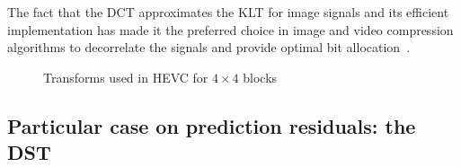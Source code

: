 \documentclass[11pt,a4paper,openright,twoside]{book}
\numberwithin{equation}{section} %
\numberwithin{figure}{section} %
\numberwithin{table}{section} %
\begin{document}
The fact that the \ac{DCT} approximates the \ac{KLT} for image signals and its
efficient implementation has made it the preferred choice in image and video
compression algorithms to decorrelate the signals and provide optimal bit
allocation~\cite{sole-12-transform-coefficient-coding}.

\begin{figure}[tb]
	\centering
	\hspace{0.2\linewidth}
	\caption{Transforms used in \acs{HEVC} for $4\times4$ blocks}
	\label{fig:dct_dst}
\end{figure}

\subsection{Particular case on prediction residuals: the \acs{DST}}
\label{sub:particular_case_dst}
\end{document}
